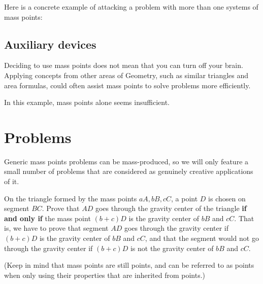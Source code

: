 \documentclass{article}
\begin{document}
\bigskip
Here is a concrete example of attacking a problem with more than one systems of mass points:
\begin{exam}
\end{exam}
\subsection{Auxiliary devices}
Deciding to use mass points does not mean that you can turn off your brain. Applying concepts from other areas of Geometry, such as similar triangles and area formulas, could often assist mass points to solve problems more efficiently.
\begin{exam}
\end{exam}
In this example, mass points alone seems insufficient.
\section{Problems}
Generic mass points problems can be mass-produced, so we will only feature a small number of problems that are considered as genuinely creative applications of it.
\begin{prob}{1}
On the triangle formed by the mass points $aA,bB,cC$, a point $D$ is chosen on segment $BC$. Prove that $AD$ goes through the gravity center of the triangle \textbf{if and only if} the mass point $(b+c)D$ is the gravity center of $bB$ and $cC$. That is, we have to prove that segment $AD$ goes through the gravity center if $(b+c)D$ is the gravity center of $bB$ and $cC$, and that the segment would not go through the gravity center if $(b+c)D$ is not the gravity center of $bB$ and $cC$.

(Keep in mind that mass points are still points, and can be referred to as points when only using their properties that are inherited from points.)
\end{prob}
\begin{prob}[MATHCOUNTS 2012]{6}
\end{prob}
\end{document}
